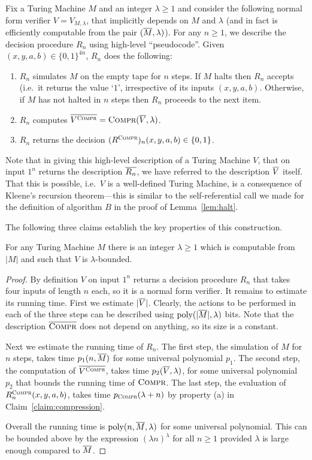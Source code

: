 Fix a Turing Machine $M$ and an integer $\lambda \geq 1$ and consider the following normal form verifier $V=V_{M,\lambda}$, that implicitly depends on $M$ and $\lambda$ (and in fact is efficiently computable from the pair $(\overline{M},\lambda)$). For any $n\geq 1$, we describe the decision procedure $R_n$ using high-level ``pseudocode''. Given $(x,y,a,b) \in \{0,1\}^{4n}$, $R_n$ does the following:
\begin{enumerate}
\item $R_n$ simulates $M$ on the empty tape for $n$ steps. If $M$ halts then $R_n$ accepts (i.e.\ it returns the value `$1$', irrespective of its inputs $(x,y,a,b)$. Otherwise, if $M$ has not halted in $n$ steps then $R_n$ proceeds to the next item.
\item $R_n$ computes $\overline{V^{\textsc{Compr}}} = \textsc{Compr}(\overline{V},\lambda)$.
\item $R_n$ returns the decision $(R^{\textsc{Compr}})_n(x,y,a,b) \in \{0,1\}$. 
\end{enumerate}
Note that in giving this high-level description of a Turing Machine $V$, that on input $1^n$ returns the description $\overline{R_n}$, we have referred to the description $\overline{V}$ itself. That this is possible, i.e.\ $V$ is a well-defined Turing Machine, is a consequence of Kleene's recursion theorem---this is similar to the self-referential call we made for the definition of algorithm $B$ in the proof of Lemma~\ref{lem:halt}. 

The following three claims establish the key properties of this construction. 

\begin{claim}\label{claim:lambda-bound}
For any Turing Machine $M$ there is an integer $\lambda \geq 1$ which is computable from $|M|$ and such that $V$ is $\lambda$-bounded.
\end{claim}

\begin{proof}
By definition $V$ on input $1^n$ returns a decision procedure $R_n$ that takes four inputs of length $n$ each, so it is a normal form verifier. It remains to estimate its running time. First we estimate $|\overline{V}|$. Clearly, the actions to be performed in each of the three steps can be described using $\operatorname{poly}(|\overline{M}|,\lambda)$ bits. Note that the description $\overline{\textsc{Compr}}$ does not depend on anything, so its size is a constant. 

Next we estimate the running time of $R_n$. 
The first step, the simulation of $M$ for $n$ steps, takes time $p_1(n, \overline{M})$ for some universal polynomial $p_1$. The second step, the computation of $\overline{V^{\textsc{Compr}}}$, takes time $p_2(\overline{V},\lambda)$, for some universal polynomial $p_2$ that bounds the running time of $\textsc{Compr}$. The last step, the evaluation of $R_n^{\textsc{Compr}}(x,y,a,b)$, takes time $p_{\textsc{Compr}}(\lambda+n)$ by property (a) in Claim~\ref{claim:compression}.

Overall the running time is $\operatorname{poly}(n,\overline{M},\lambda)$ for some universal polynomial. This can be bounded above by the expression $(\lambda n)^\lambda$ for all $n\geq 1$ provided $\lambda$ is large enough compared to $\overline{M}$. 
\end{proof}


